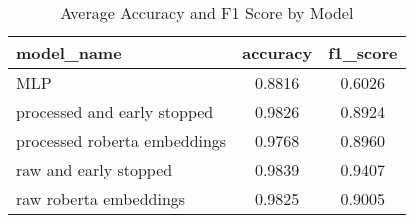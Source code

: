 \begin{table}
\caption{Average Accuracy and F1 Score by Model}
\label{tab:avg_model_scores}
\begin{tabular}{lcc}
\toprule
model_name & accuracy & f1_score \\
\midrule
MLP & 0.8816 & 0.6026 \\
processed and early stopped & 0.9826 & 0.8924 \\
processed roberta embeddings & 0.9768 & 0.8960 \\
raw and early stopped & 0.9839 & 0.9407 \\
raw roberta embeddings & 0.9825 & 0.9005 \\
\bottomrule
\end{tabular}
\end{table}
